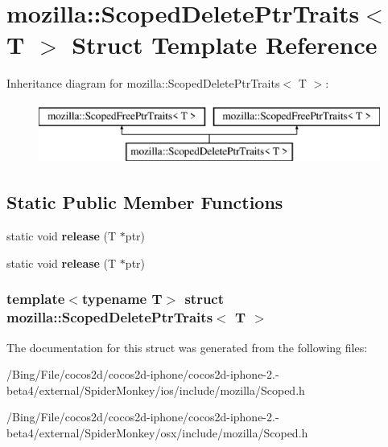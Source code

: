 \hypertarget{structmozilla_1_1_scoped_delete_ptr_traits}{\section{mozilla\-:\-:Scoped\-Delete\-Ptr\-Traits$<$ T $>$ Struct Template Reference}
\label{structmozilla_1_1_scoped_delete_ptr_traits}
}
Inheritance diagram for mozilla\-:\-:Scoped\-Delete\-Ptr\-Traits$<$ T $>$\-:\begin{figure}[H]
\begin{center}
\leavevmode
\includegraphics[height=2.000000cm]{structmozilla_1_1_scoped_delete_ptr_traits}
\end{center}
\end{figure}
\subsection*{Static Public Member Functions}
\begin{DoxyCompactItemize}
\item 
\hypertarget{structmozilla_1_1_scoped_delete_ptr_traits_ab8995a47c70c8e45b0812fbfc0bf9c22}{static void {\bfseries release} (T $\ast$ptr)}\label{structmozilla_1_1_scoped_delete_ptr_traits_ab8995a47c70c8e45b0812fbfc0bf9c22}

\item 
\hypertarget{structmozilla_1_1_scoped_delete_ptr_traits_ab8995a47c70c8e45b0812fbfc0bf9c22}{static void {\bfseries release} (T $\ast$ptr)}\label{structmozilla_1_1_scoped_delete_ptr_traits_ab8995a47c70c8e45b0812fbfc0bf9c22}

\end{DoxyCompactItemize}
\subsubsection*{template$<$typename T$>$ struct mozilla\-::\-Scoped\-Delete\-Ptr\-Traits$<$ T $>$}



The documentation for this struct was generated from the following files\-:\begin{DoxyCompactItemize}
\item 
/\-Bing/\-File/cocos2d/cocos2d-\/iphone/cocos2d-\/iphone-\/2.-\/beta4/external/\-Spider\-Monkey/ios/include/mozilla/Scoped.\-h\item 
/\-Bing/\-File/cocos2d/cocos2d-\/iphone/cocos2d-\/iphone-\/2.-\/beta4/external/\-Spider\-Monkey/osx/include/mozilla/Scoped.\-h\end{DoxyCompactItemize}

